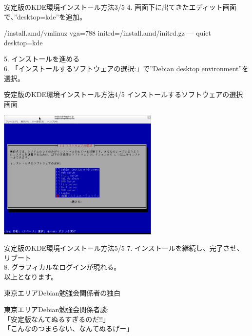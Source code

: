 \begin{frame}[containsverbatim]{安定版のKDE環境インストール方法3/5}
4. 画面下に出てきたエディット画面で、''desktop=kde''を追加。\\
\begin{commandline}
 /install.amd/vmlinuz vga=788 initrd=/install.amd/initrd.gz 
    --- quiet desktop=kde
\end{commandline}
5. インストールを進める\\
6. 「インストールするソフトウェアの選択:」で''Debian desktop environment''を選択。
\end{frame}

\begin{frame}{安定版のKDE環境インストール方法4/5}
インストールするソフトウェアの選択画面
\begin{center}
\includegraphics[width=8cm]{image201202/kdedesk/stable-inst-chooser-soft.png}
\end{center}
\end{frame}

\begin{frame}[containsverbatim]{安定版のKDE環境インストール方法5/5}
7. インストールを継続し、完了させ、リブート\\
8. グラフィカルなログインが現れる。\\

以上となります。
\end{frame}

\begin{frame}{東京エリアDebian勉強会関係者の独白}
\begin{center}
\Large
東京エリアDebian勉強会関係者談: \\
「安定版なんてぬるすぎるのだ!!」\\
「こんなのつまらない、なんてぬるげー」
\end{center}
\end{frame}

